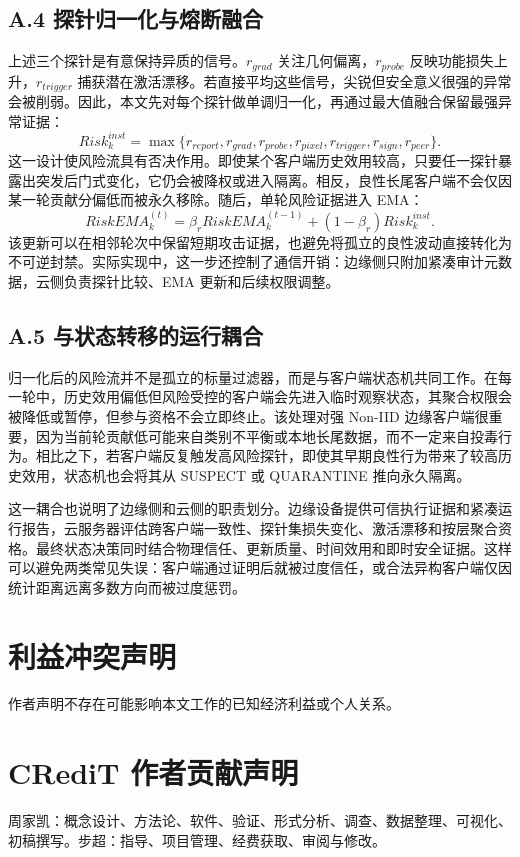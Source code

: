 \documentclass[11pt, a4paper, UTF8, fontset=fandol]{ctexart}
\begin{document}
\subsection{A.4 探针归一化与熔断融合}
上述三个探针是有意保持异质的信号。$r_{grad}$ 关注几何偏离，$r_{probe}$ 反映功能损失上升，$r_{trigger}$ 捕获潜在激活漂移。若直接平均这些信号，尖锐但安全意义很强的异常会被削弱。因此，本文先对每个探针做单调归一化，再通过最大值融合保留最强异常证据：
\begin{equation}
    Risk_{k}^{inst}=\max\{r_{report},r_{grad},r_{probe},r_{pixel},r_{trigger},r_{sign},r_{peer}\}.
\end{equation}
这一设计使风险流具有否决作用。即使某个客户端历史效用较高，只要任一探针暴露出突发后门式变化，它仍会被降权或进入隔离。相反，良性长尾客户端不会仅因某一轮贡献分偏低而被永久移除。随后，单轮风险证据进入 EMA：
\begin{equation}
    RiskEMA_{k}^{(t)}=\beta_r RiskEMA_{k}^{(t-1)}+(1-\beta_r)Risk_{k}^{inst}.
\end{equation}
该更新可以在相邻轮次中保留短期攻击证据，也避免将孤立的良性波动直接转化为不可逆封禁。实际实现中，这一步还控制了通信开销：边缘侧只附加紧凑审计元数据，云侧负责探针比较、EMA 更新和后续权限调整。

\subsection{A.5 与状态转移的运行耦合}
归一化后的风险流并不是孤立的标量过滤器，而是与客户端状态机共同工作。在每一轮中，历史效用偏低但风险受控的客户端会先进入临时观察状态，其聚合权限会被降低或暂停，但参与资格不会立即终止。该处理对强 Non-IID 边缘客户端很重要，因为当前轮贡献低可能来自类别不平衡或本地长尾数据，而不一定来自投毒行为。相比之下，若客户端反复触发高风险探针，即使其早期良性行为带来了较高历史效用，状态机也会将其从 SUSPECT 或 QUARANTINE 推向永久隔离。

这一耦合也说明了边缘侧和云侧的职责划分。边缘设备提供可信执行证据和紧凑运行报告，云服务器评估跨客户端一致性、探针集损失变化、激活漂移和按层聚合资格。最终状态决策同时结合物理信任、更新质量、时间效用和即时安全证据。这样可以避免两类常见失误：客户端通过证明后就被过度信任，或合法异构客户端仅因统计距离远离多数方向而被过度惩罚。

\section*{利益冲突声明}
作者声明不存在可能影响本文工作的已知经济利益或个人关系。

\section*{CRediT 作者贡献声明}
周家凯：概念设计、方法论、软件、验证、形式分析、调查、数据整理、可视化、初稿撰写。步超：指导、项目管理、经费获取、审阅与修改。
\end{document}
